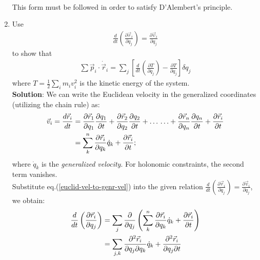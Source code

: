 \begin{enumerate}
\begin{align*}
    \end{align*}
    This form must be followed in order to satisfy D'Alembert's principle.\bigskip
    \hline\hline\bigskip
    \item Use
    \begin{align*}
    \frac{d}{dt} \left( \frac{\partial \vec{r}_i}{\partial q_j} \right) = \frac{\partial \vec{v}_i}{\partial q_j}
    \end{align*}
    to show that
    \begin{align*}
    \sum \vec{p}_i \cdot \dot{\vec{r}}_i = \sum_j\left[ \frac{d}{dt} \left( \frac{\partial T}{\partial \dot{q}_j} \right) - \frac{\partial T}{\partial q_j} \right] \delta q_j
    \end{align*}
    where $\displaystyle T = \frac{1}{2} \sum_i m_i v_i^2$ is the kinetic energy of the system.\\\bigskip
    \hline\hline\bigskip
     \textbf{Solution}: 
     We can write the Euclidean velocity in the generalized coordinates (utilizing the chain rule) as:
    \begin{align}
        \vec{v}_i=\frac{d\vec{r}_i}{dt}&=\frac{\partial \vec{r}_1}{\partial q_1}\frac{\partial q_1}{\partial t}+\frac{\partial \vec{r}_2}{\partial q_2}\frac{\partial q_2}{\partial t}+\ldots\,\ldots+\frac{\partial \vec{r}_n}{\partial q_n}\frac{\partial q_n}{\partial t}+\frac{\partial \vec{r}_i}{\partial t}\notag\\
        &=\sum_k^n \frac{\partial \vec{r}_i}{\partial q_k}\dot{q}_k+\frac{\partial \vec{r}_i}{\partial t};\label{euclid-vel-to-genr-vel}
    \end{align}
    where $\dot{q}_k$ is the \textit{generalized velocity}. For holonomic constraints, the second term vanishes. \\
    Substitute eq.(\ref{euclid-vel-to-genr-vel}) into the given relation $\displaystyle\frac{d}{dt} \left( \frac{\partial \vec{r}_i}{\partial q_j} \right) = \frac{\partial \vec{v}_i}{\partial q_j}$, we obtain:
    \begin{align}
        \frac{d}{dt} \left( \frac{\partial \vec{r}_i}{\partial q_j} \right) &=\sum_j\frac{\partial}{\partial q_j}\left(\sum_k^n \frac{\partial \vec{r}_i}{\partial q_k}\dot{q}_k+\frac{\partial \vec{r}_i}{\partial t}\right)\notag\\
        &=\sum_{j,k}\frac{\partial^2\vec{r}_i}{\partial q_j\partial q_k}\dot{q}_k+\frac{\partial^2\vec{r}_i}{\partial q_j\partial t}
    \end{align}

\end{enumerate}
